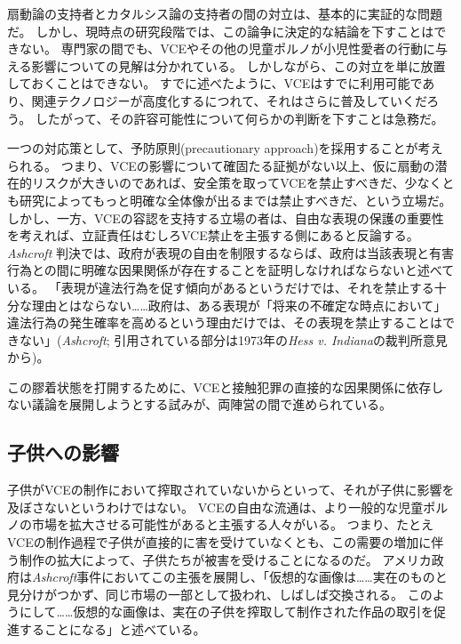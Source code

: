 \documentclass[paper=a4,book,openany]{jlreq}
\begin{document}
扇動論の支持者とカタルシス論の支持者の間の対立は、基本的に実証的な問題だ。
しかし、現時点の研究段階では、この論争に決定的な結論を下すことはできない。
専門家の間でも、VCEやその他の児童ポルノが小児性愛者の行動に与える影響についての見解は分かれている\citep{ost02:_child_risk, quayle02:_child_pornog_inter, endrass09:_consum_inter_child_pornog_violen_sex_offen, seto11:_contac_sexual_offen_men_onlin, hessick11:_disen_child_pornog_child_sex_abuse}。
しかしながら、この対立を単に放置しておくことはできない。
すでに述べたように、VCEはすでに利用可能であり、関連テクノロジーが高度化するにつれて、それはさらに普及していくだろう。
したがって、その許容可能性について何らかの判断を下すことは急務だ。

一つの対応策として、予防原則(precautionary approach)を採用することが考えられる。
つまり、VCEの影響について確固たる証拠がない以上、仮に扇動の潜在的リスクが大きいのであれば、安全策を取ってVCEを禁止すべきだ、少なくとも研究によってもっと明確な全体像が出るまでは禁止すべきだ、という立場だ。
しかし、一方、VCEの容認を支持する立場の者は、自由な表現の保護の重要性を考えれば、立証責任はむしろVCE禁止を主張する側にあると反論する。
\emph{Ashcroft} 判決では、政府が表現の自由を制限するならば、政府は当該表現と有害行為との間に明確な因果関係が存在することを証明しなければならないと述べている。
「表現が違法行為を促す傾向があるというだけでは、それを禁止する十分な理由とはならない……政府は、ある表現が「将来の不確定な時点において」違法行為の発生確率を高めるという理由だけでは、その表現を禁止することはできない」(\emph{Ashcroft}; 引用されている部分は1973年の\emph{Hess v. Indiana}の裁判所意見から)。

この膠着状態を打開するために、VCEと接触犯罪の直接的な因果関係に依存しない議論を展開しようとする試みが、両陣営の間で進められている。

\subsection{子供への影響}

子供がVCEの制作において搾取されていないからといって、それが子供に影響を及ぼさないというわけではない。
VCEの自由な流通は、より一般的な児童ポルノの市場を拡大させる可能性があると主張する人々がいる。
つまり、たとえVCEの制作過程で子供が直接的に害を受けていなくとも、この需要の増加に伴う制作の拡大によって、子供たちが被害を受けることになるのだ。
アメリカ政府は\emph{Ashcroft}事件においてこの主張を展開し、「仮想的な画像は……実在のものと見分けがつかず、同じ市場の一部として扱われ、しばしば交換される。
このようにして……仮想的な画像は、実在の子供を搾取して制作された作品の取引を促進することになる」と述べている。
\end{document}
